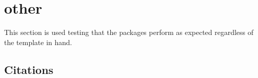 \graphicspath{ {./content/other/figures/} }

\section{other}
\label{sec:other}  %

This section is used testing that the packages perform as expected regardless of the template in hand.

\subsection{Citations}
\label{sec:other:citations}




%
%
%
%
%



